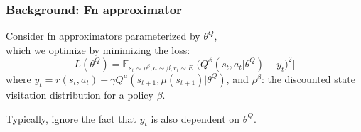 \begin{frame}
\frametitle{Background: Fn approximator}
Consider fn approximators parameterized by $\theta^Q$, \\
which we optimize by minimizing the loss:
\begin{equation*}
L(\theta^Q) =\mathbb{E}_{s_t \sim \rho^{\beta}, a \sim \beta, r_t \sim E} \Big[ \Big( Q^{\phi} (s_t,a_t|\theta^Q) - y_t \Big)^2 \Big]
\end{equation*}
where
$y_t = r(s_t,a_t) + \gamma Q^{\mu}(s_{t+1},\mu(s_{t+1}) | \theta^Q)$, and
$\rho^{\beta}$: the discounted state visitation distribution for a policy $\beta$.

Typically, ignore the fact that $y_t$ is also dependent on $\theta^Q$.\\

\end{frame}


